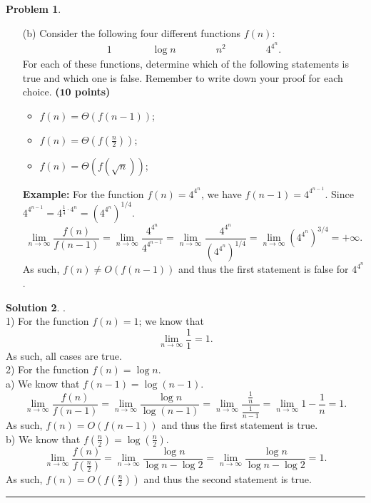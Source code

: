 \documentclass{article}
\theoremstyle{definition}
\newtheorem{problem}{Problem}
\def\fline{\rule{0.75\linewidth}{0.5pt}}
\newcommand{\finishline}{\begin{center}\fline\end{center}}
\newtheorem*{solution*}{Solution}
\newenvironment{solution}{\begin{solution*}}{{\finishline} \end{solution*}}
\newcommand{\grade}[1]{\hfill{\textbf{($\mathbf{#1}$ points)}}}
\begin{document}
\begin{problem}
\begin{enumerate}
\begin{solution}
\end{solution}
	
	\item[(b)]  Consider the following four different functions $f(n)$: 
	  \begin{align*}
	    1 \qquad\qquad  \log n \qquad\qquad  n^2  \qquad\qquad  4^{4^{n}}.
	  \end{align*} 
	 For each of these functions, determine which of the following statements is true and which one is false. Remember to write down your proof for each choice.    \grade{10} 
	\begin{itemize}
        \item $f(n) = \Theta(f(n-1))$;
        \item $f(n) = \Theta(f(\frac{n}{2}))$;
        \item $f(n) = \Theta(f(\sqrt n))$;
    \end{itemize}
    
    \smallskip
	\textbf{Example:} For the function $f(n) = 4^{4^n}$, we have $f(n-1) = 4^{4^{n-1}}$.  Since $4^{4^{n-1}}= 4^{\frac{1}{4} \cdot 4^n} = (4^{4^{n}})^{1/4}$.
	\[
		\lim_{n \to \infty}\frac{f(n)}{f(n-1)} = \lim_{n \to \infty}\frac{4^{4^{n}}}{4^{4^{n-1}}} = \lim_{n \to \infty}\frac{4^{4^{n}}}{(4^{4^{n}})^{1/4}} = \lim_{n \to \infty}(4^{4^{n}})^{3/4} = +\infty.
	\]	
	As such, $f(n) \neq O(f(n-1))$ and thus the first statement is false for $4^{4^n}$.

    \end{enumerate}
    
    \begin{solution} .\\
    
  	 1) For the function $f(n) = 1$; we know that 
	 \[ 
	 	\lim_{n \to \infty}\frac{1}{1} = 1.
	\] 
	 As such, all cases are true. \\

	 2) For the function $f(n) = \log n$. \\
	 
	 	a) We know that $f(n-1) = \log(n -1)$. 
	 	\[
			\lim_{n \to \infty}\frac{f(n)}{f(n-1)} = \lim_{n \to \infty}\frac{\log n}{\log(n -1)} = \lim_{n \to \infty}\frac{\frac{1}{n}}{\frac{1}{n-1}} = \lim_{n \to \infty}1 - \frac{1}{n} = 1.
		\]	
			As such, $f(n) = O(f(n-1))$ and thus the first statement is true. \\ 
			
	 	b) We know that $f(\frac{n}{2}) = \log(\frac{n}{2})$. 
	 	\[
			\lim_{n \to \infty}\frac{f(n)}{f(\frac{n}{2})} = \lim_{n \to \infty}\frac{\log n}{\log n - \log 2} = \lim_{n \to \infty}\frac{\log n}{\log n - \log 2} = 1.
		\]	
			As such, $f(n) = O(f(\frac{n}{2}))$ and thus the second statement is true. \\ 
		

\end{solution}
\end{problem}
\end{document}
